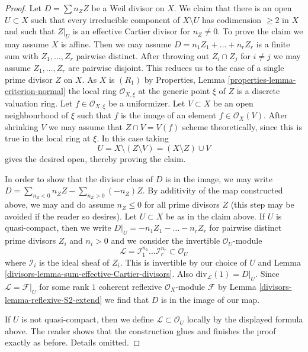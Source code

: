 \begin{proof}
\medskip\noindent
Let $D = \sum n_Z Z$ be a Weil divisor on $X$.
We claim that there is an open $U \subset X$ such that
every irreducible component of $X \setminus U$ has codimension $\geq 2$
in $X$ and such that $Z|_U$ is an effective Cartier divisor
for $n_Z \not = 0$. To prove the claim we may assume $X$ is affine.
Then we may assume $D = n_1 Z_1 + \ldots + n_r Z_r$ is a finite sum
with $Z_1, \ldots, Z_r$ pairwise distinct. After throwing out
$Z_i \cap Z_j$ for $i \not = j$ we may assume $Z_1, \ldots, Z_r$
are pairwise disjoint. This reduces us to the case of a single
prime divisor $Z$ on $X$. As $X$ is $(R_1)$ by
Properties, Lemma \ref{properties-lemma-criterion-normal}
the local ring
$\mathcal{O}_{X, \xi}$ at the generic point $\xi$ of $Z$ is a discrete
valuation ring. Let $f \in \mathcal{O}_{X, \xi}$ be a uniformizer.
Let $V \subset X$ be an open neighbourhood of $\xi$ such that
$f$ is the image of an element $f \in \mathcal{O}_X(V)$.
After shrinking $V$ we may assume that $Z \cap V = V(f)$
scheme theoretically, since this is true in the local ring
at $\xi$. In this case taking
$$
U = X \setminus (Z \setminus V) = (X \setminus Z) \cup V
$$
gives the desired open, thereby proving the claim.

\medskip\noindent
In order to show that the divisor class of $D$ is in the image,
we may write $D = \sum_{n_Z < 0} n_Z Z - \sum_{n_Z > 0} (-n_Z) Z$.
By additivity of the map constructed above, we
may and do assume $n_Z \leq 0$ for all prime divisors $Z$
(this step may be avoided if the reader so desires).
Let $U \subset X$ be as in the claim above. If $U$ is quasi-compact,
then we write $D|_U = -n_1 Z_1 - \ldots - n_r Z_r$ for
pairwise distinct prime divisors $Z_i$ and $n_i > 0$ and
we consider the invertible $\mathcal{O}_U$-module
$$
\mathcal{L} =
\mathcal{I}_1^{n_1} \ldots \mathcal{I}_r^{n_r} \subset \mathcal{O}_U
$$
where $\mathcal{I}_i$ is the ideal sheaf of $Z_i$.
This is invertible by our choice of $U$ and
Lemma \ref{divisors-lemma-sum-effective-Cartier-divisors}.
Also $\text{div}_\mathcal{L}(1) = D|_U$.
Since $\mathcal{L} = \mathcal{F}|_U$ for some rank $1$ coherent
reflexive $\mathcal{O}_X$-module $\mathcal{F}$ by
Lemma \ref{divisors-lemma-reflexive-S2-extend} we find that $D$ is
in the image of our map.

\medskip\noindent
If $U$ is not quasi-compact, then we define
$\mathcal{L} \subset \mathcal{O}_U$ locally by the displayed formula
above. The reader shows that the construction glues and
finishes the proof exactly as before. Details omitted.
\end{proof}

